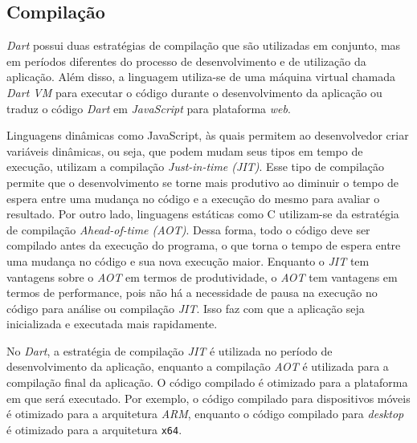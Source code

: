 \subsection{Compilação}
\textit{Dart} possui duas estratégias de compilação que são utilizadas em conjunto, mas em períodos diferentes do processo de desenvolvimento e de utilização da aplicação. Além disso, a linguagem utiliza-se de uma máquina virtual chamada \textit{Dart VM} para executar o código durante o desenvolvimento da aplicação ou traduz o código \textit{Dart} em \textit{JavaScript} para plataforma \textit{web}.

Linguagens dinâmicas como JavaScript, às quais permitem ao desenvolvedor criar variáveis dinâmicas, ou seja, que podem mudam seus tipos em tempo de execução, utilizam a compilação \textit{Just-in-time (JIT)}. Esse tipo de compilação permite que o desenvolvimento se torne mais produtivo ao diminuir o tempo de espera entre uma mudança no código e a execução do mesmo para avaliar o resultado. Por outro lado, linguagens estáticas como C utilizam-se da estratégia de compilação \textit{Ahead-of-time (AOT)}. Dessa forma, todo o código deve ser compilado antes da execução do programa, o que torna o tempo de espera entre uma mudança no código e sua nova execução maior. Enquanto o \textit{JIT} tem vantagens sobre o \textit{AOT} em termos de produtividade, o \textit{AOT} tem vantagens em termos de performance, pois não há a necessidade de pausa na execução no código para análise ou compilação \textit{JIT}. Isso faz com que a aplicação seja inicializada e executada mais rapidamente. 



No \textit{Dart}, a estratégia de compilação \textit{JIT} é utilizada no período de desenvolvimento da aplicação, enquanto a compilação \textit{AOT} é utilizada para a compilação final da aplicação. O código compilado é otimizado para a plataforma em que será executado. Por exemplo, o código compilado para dispositivos móveis é otimizado para a arquitetura \textit{ARM}, enquanto o código compilado para \textit{desktop} é otimizado para a arquitetura \texttt{x64}.


